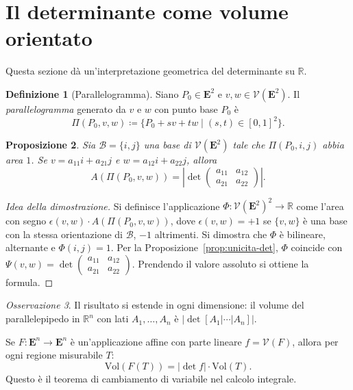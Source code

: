 \documentclass[11pt, a4paper]{book}
\theoremstyle{definition}
\newtheorem{definizione}{Definizione}[section]
\theoremstyle{plain}
\newtheorem{proposizione}[definizione]{Proposizione}
\theoremstyle{remark}
\newtheorem{osservazione}[definizione]{Osservazione}
\newcommand{\R}{\mathbb{R}}
\begin{document}
\section{Il determinante come volume orientato}
\label{sec:det-area}

Questa sezione dà un'interpretazione geometrica del determinante su $\R$.

\begin{defbox}
\begin{definizione}[Parallelogramma]
Siano $P_0 \in \mathbf{E}^2$ e $v, w \in \mathcal{V}(\mathbf{E}^2)$. Il \emph{parallelogramma} generato da $v$ e $w$ con punto base $P_0$ è
\[
  \Pi(P_0,v,w) \coloneqq \{P_0 + sv + tw \mid (s,t) \in [0,1]^2\}.
\]
\end{definizione}
\end{defbox}

\begin{proposizione}
\label{prop:det-area}
Sia $\mathcal{B}=\{i,j\}$ una base di $\mathcal{V}(\mathbf{E}^2)$ tale che $\Pi(P_0,i,j)$ abbia area $1$. Se $v = a_{11}i+a_{21}j$ e $w=a_{12}i+a_{22}j$, allora
\[
  A(\Pi(P_0,v,w)) = \left|\det\begin{pmatrix}a_{11}&a_{12}\\a_{21}&a_{22}\end{pmatrix}\right|.
\]
\end{proposizione}

\begin{proof}[Idea della dimostrazione]
Si definisce l'applicazione $\Phi \colon \mathcal{V}(\mathbf{E}^2)^2 \to \R$ come l'area con segno $\epsilon(v,w)\cdot A(\Pi(P_0,v,w))$, dove $\epsilon(v,w) = +1$ se $\{v,w\}$ è una base con la stessa orientazione di $\mathcal{B}$, $-1$ altrimenti. Si dimostra che $\Phi$ è bilineare, alternante e $\Phi(i,j)=1$. Per la Proposizione~\ref{prop:unicita-det}, $\Phi$ coincide con $\Psi(v,w) = \det\begin{pmatrix}a_{11}&a_{12}\\a_{21}&a_{22}\end{pmatrix}$. Prendendo il valore assoluto si ottiene la formula.
\end{proof}

\begin{osservazione}
Il risultato si estende in ogni dimensione: il volume del parallelepipedo in $\R^n$ con lati $A_1,\ldots,A_n$ è $|\det[A_1|\cdots|A_n]|$.

Se $F \colon \mathbf{E}^n \to \mathbf{E}^n$ è un'applicazione affine con parte lineare $f = \mathcal{V}(F)$, allora per ogni regione misurabile $T$:
\[
  \mathrm{Vol}(F(T)) = |\det f|\cdot\mathrm{Vol}(T).
\]
Questo è il teorema di cambiamento di variabile nel calcolo integrale.
\end{osservazione}
\end{document}
